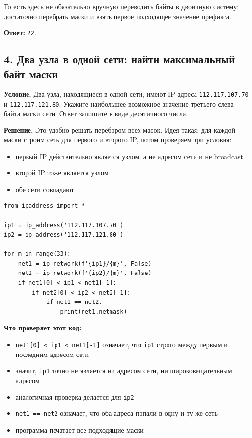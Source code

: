 \documentclass[11pt]{article}
\begin{document}
То есть здесь не обязательно вручную переводить байты в двоичную систему: достаточно перебрать маски и взять первое подходящее значение префикса.

\textbf{Ответ:} \texttt{22}.

\subsection*{4. Два узла в одной сети: найти максимальный байт маски}

\textbf{Условие.} Два узла, находящиеся в одной сети, имеют IP-адреса \texttt{112.117.107.70} и \texttt{112.117.121.80}. Укажите наибольшее возможное значение третьего слева байта маски сети. Ответ запишите в виде десятичного числа.

\textbf{Решение.} Это удобно решать перебором всех масок. Идея такая: для каждой маски строим сеть для первого и второго IP, потом проверяем три условия:
\begin{itemize}
  \item первый IP действительно является узлом, а не адресом сети и не broadcast
  \item второй IP тоже является узлом
  \item обе сети совпадают
\end{itemize}

\begin{verbatim}
from ipaddress import *

ip1 = ip_address('112.117.107.70')
ip2 = ip_address('112.117.121.80')

for m in range(33):
    net1 = ip_network(f'{ip1}/{m}', False)
    net2 = ip_network(f'{ip2}/{m}', False)
    if net1[0] < ip1 < net1[-1]:
        if net2[0] < ip2 < net2[-1]:
            if net1 == net2:
                print(net1.netmask)
\end{verbatim}

\textbf{Что проверяет этот код:}
\begin{itemize}
  \item \texttt{net1[0] < ip1 < net1[-1]} означает, что \texttt{ip1} строго между первым и последним адресом сети
  \item значит, \texttt{ip1} точно не является ни адресом сети, ни широковещательным адресом
  \item аналогичная проверка делается для \texttt{ip2}
  \item \texttt{net1 == net2} означает, что оба адреса попали в одну и ту же сеть
  \item программа печатает все подходящие маски
\end{itemize}
\end{document}
